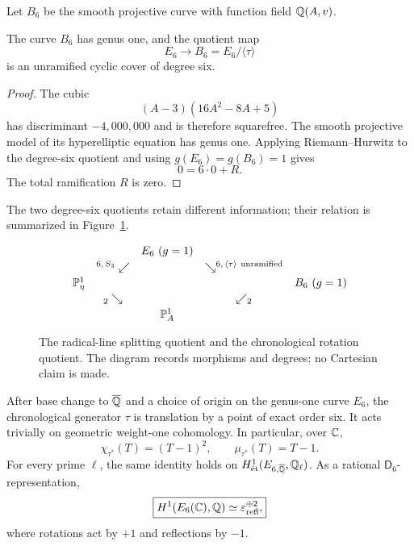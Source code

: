 Let $B_6$ be the smooth projective curve with function field
$\mathbb Q(A,v)$.

\begin{lemma}\label{lem:quotient-genus}
The curve $B_6$ has genus one, and the quotient map
\begin{equation}\label{eq:cyclic-quotient}
 E_6\longrightarrow B_6=E_6/\langle\tau\rangle
\end{equation}
is an unramified cyclic cover of degree six.
\end{lemma}

\begin{proof}
The cubic
\[
 (A-3)(16A^2-8A+5)
\]
has discriminant $-4{,}000{,}000$ and is therefore squarefree.  The smooth
projective model of its hyperelliptic equation has genus one.  Applying
Riemann--Hurwitz to the degree-six quotient and using
$g(E_6)=g(B_6)=1$ gives
\[
 0=6\cdot0+R.
\]
The total ramification $R$ is zero.
\end{proof}

The two degree-six quotients retain different information; their relation is
summarized in Figure~\ref{fig:quotient-diamond}.
\begin{figure}[htbp]
\centering
\[
\begin{array}{ccccc}
 && E_6\ (g=1) && \\[2pt]
 & {}^{6,\,S_3}\swarrow && \searrow^{6,\,\langle\tau\rangle\ \mathrm{unramified}} & \\[2pt]
 \Pone_\eta &&&& B_6\ (g=1) \\[2pt]
 & {}_{2}\searrow && \swarrow_{2} & \\[2pt]
 && \Pone_A &&
\end{array}
\]
\caption{The radical-line splitting quotient and the chronological rotation
quotient.  The diagram records morphisms and degrees; no Cartesian claim is
made.}
\label{fig:quotient-diamond}
\end{figure}

\begin{theorem}\label{thm:collapse}
After base change to $\overline{\mathbb Q}$ and a choice of origin on the genus-one curve
$E_6$, the chronological generator $\tau$ is translation by a point of
exact order six.  It acts trivially on geometric weight-one cohomology.  In
particular, over $\mathbb C$,
\begin{equation}\label{eq:tau-charpoly}
 \boxed{
 \chi_{\tau^*}(T)=(T-1)^2,
 \qquad
 \mu_{\tau^*}(T)=T-1.}
\end{equation}
For every prime $\ell$, the same identity holds on
$H^1_{\textnormal{\'et}}(E_{6,\overline{\mathbb Q}},\mathbb Q_\ell)$.  As a rational
$\mathsf D_6$-representation,
\begin{equation}\label{eq:reflection-sign}
 \boxed{
 H^1(E_6(\mathbb C),\mathbb Q)
 \simeq\varepsilon_{\mathrm{refl}}^{\oplus2},}
\end{equation}
where rotations act by $+1$ and reflections by $-1$.
\end{theorem}

